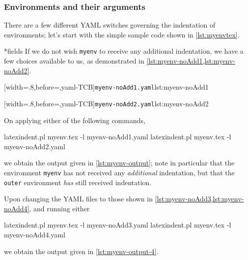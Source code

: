 \subsubsection{Environments and their arguments}\label{subsubsec:env-and-their-args}
There are a few different YAML switches governing the indentation of environments; let's start 
with the simple sample code shown in \cref{lst:myenvtex}.


*{fields} 
If we do not wish \texttt{myenv} to receive any additional indentation, we have a few choices available to us, 
as demonstrated in \cref{lst:myenv-noAdd1,lst:myenv-noAdd2}.

\begin{minipage}{.45\textwidth}
[width=.8\linewidth,before=\centering,yaml-TCB]{\texttt{myenv-noAdd1.yaml}}{lst:myenv-noAdd1}
\end{minipage}
\hfill
\begin{minipage}{.45\textwidth}
[width=.8\linewidth,before=\centering,yaml-TCB]{\texttt{myenv-noAdd2.yaml}}{lst:myenv-noAdd2}
\end{minipage}

On applying either of the following commands,
\begin{commandshell}
latexindent.pl myenv.tex -l myenv-noAdd1.yaml  
latexindent.pl myenv.tex -l myenv-noAdd2.yaml  
\end{commandshell}
we obtain the output given in \cref{lst:myenv-output}; note in particular that the environment \texttt{myenv} 
has not received any \emph{additional} indentation, but that the \texttt{outer} environment \emph{has} still 
received indentation.


Upon changing the YAML files to those shown in \cref{lst:myenv-noAdd3,lst:myenv-noAdd4}, and running either
\begin{commandshell}
latexindent.pl myenv.tex -l myenv-noAdd3.yaml  
latexindent.pl myenv.tex -l myenv-noAdd4.yaml  
\end{commandshell}
we obtain the output given in \cref{lst:myenv-output-4}. 

